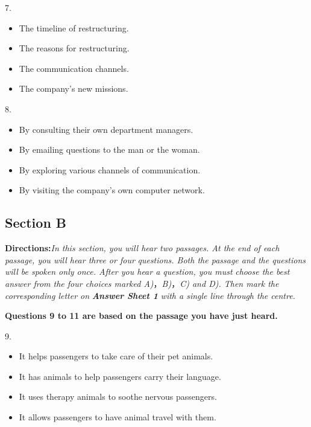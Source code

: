 \documentclass[UTF8,11pt]{ctexart}
\begin{document}
7.


\begin{itemize}[leftmargin=2em,itemsep=.2em,topsep=.4em]\item[A.] The timeline of restructuring.
\item[B.] The reasons for restructuring.
\item[C.] The communication channels.
\item[D.] The company’s new missions.
\end{itemize}

8.


\begin{itemize}[leftmargin=2em,itemsep=.2em,topsep=.4em]\item[A.] By consulting their own department managers.
\item[B.] By emailing questions to the man or the woman.
\item[C.] By exploring various channels of communication.
\item[D.] By visiting the company’s own computer network.
\end{itemize}

\subsection*{\textbf{Section B}}


\textbf{Directions:}\textit{In this section, you will hear two passages. At the end of each passage, you will hear three or four} \textit{questions. Both the passage and the questions will be spoken only once. After you hear a question, you must} \textit{choose the best answer from the four choices marked A)}，\textit{B)}，\textit{C) and D). Then mark the corresponding letter on} \textbf{\textit{Answer Sheet 1}}\textit{ with a single line through the centre.}


\textbf{Questions 9 to 11 are based on the passage you have just heard.}


9.


\begin{itemize}[leftmargin=2em,itemsep=.2em,topsep=.4em]\item[A.] It helps passengers to take care of their pet animals.
\item[B.] It has animals to help passengers carry their language.
\item[C.] It uses therapy animals to soothe nervous passengers.
\item[D.] It allows passengers to have animal travel with them.
\end{itemize}
\end{document}
